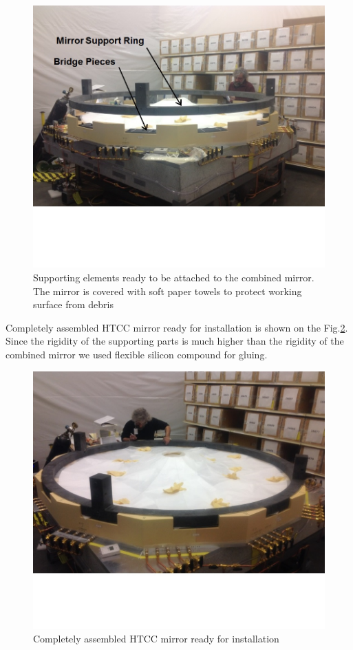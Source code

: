 \begin{figure}[ht]
    \centering
    \includegraphics[width=1.0\linewidth,trim={0 5cm 0 0},clip]{images/Support_Ring.jpg}
    \caption{Supporting elements ready to be attached to the combined mirror. The mirror is covered with soft paper towels to protect working surface from debris}
    \label{fig:Support_Ring}
\end{figure}

  Completely assembled HTCC mirror ready for installation is shown on the Fig.\ref{fig:Ring_to_Mirror}. Since the rigidity of the supporting parts is much higher than the rigidity of the combined mirror we used flexible silicon compound for gluing.
  
\begin{figure}[ht]
    \centering
    \includegraphics[width=1.0\linewidth,trim={0 5cm 0 0},clip]{images/Ring_to_Mirror.jpg}
    \caption{Completely assembled HTCC mirror ready for installation}
    \label{fig:Ring_to_Mirror}
\end{figure}
 
